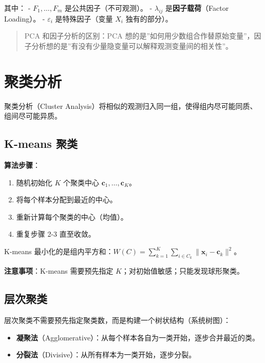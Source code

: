 \documentclass[
]{book}
\providecommand{\tightlist}{%
  \setlength{\itemsep}{0pt}\setlength{\parskip}{0pt}}
\begin{document}
其中：
- \(F_1, \ldots, F_m\) 是公共因子（不可观测）。
- \(\lambda_{ij}\) 是\textbf{因子载荷}（Factor Loading）。
- \(\varepsilon_i\) 是特殊因子（变量 \(X_i\) 独有的部分）。

\begin{quote}
PCA 和因子分析的区别：PCA 想的是''如何用少数组合作替原始变量''，因子分析想的是''有没有少量隐变量可以解释观测变量间的相关性''。
\end{quote}

\section{聚类分析}\label{ux805aux7c7bux5206ux6790}

聚类分析（Cluster Analysis）将相似的观测归入同一组，使得组内尽可能同质、组间尽可能异质。

\subsection{K-means 聚类}\label{k-means-ux805aux7c7b}

\textbf{算法步骤}：

\begin{enumerate}
\def\labelenumi{\arabic{enumi}.}
\tightlist
\item
  随机初始化 \(K\) 个聚类中心 \(\mathbf{c}_1, \ldots, \mathbf{c}_K\)。
\item
  将每个样本分配到最近的中心。
\item
  重新计算每个聚类的中心（均值）。
\item
  重复步骤 2-3 直至收敛。
\end{enumerate}

K-means 最小化的是组内平方和：\(W(C) = \sum_{k=1}^K \sum_{i \in C_k} \|\mathbf{x}_i - \mathbf{c}_k\|^2\)。

\textbf{注意事项}：K-means 需要预先指定 \(K\)；对初始值敏感；只能发现球形聚类。

\subsection{层次聚类}\label{ux5c42ux6b21ux805aux7c7b}

层次聚类不需要预先指定聚类数，而是构建一个树状结构（系统树图）：

\begin{itemize}
\tightlist
\item
  \textbf{凝聚法}（Agglomerative）：从每个样本各自为一类开始，逐步合并最近的类。
\item
  \textbf{分裂法}（Divisive）：从所有样本为一类开始，逐步分裂。
\end{itemize}
\end{document}
